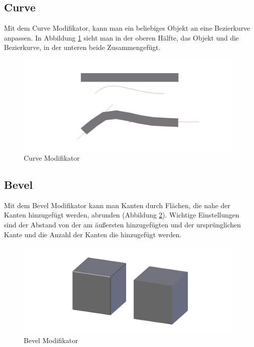 \subsection{Curve}
\citep{blender:curve_modifier} Mit dem Curve Modifikator, kann man ein beliebiges Objekt an eine Bezierkurve anpassen. In Abbildung \ref{modifikatoren:image4} sieht man
in der oberen Hälfte, das Objekt und die Bezierkurve, in der unteren beide Zusammengefügt.
\begin{figure}[h]
    \centering
    \includegraphics[width=.8\textwidth]{images/Modifikatoren-Curve.png}
    \caption{Curve Modifikator}
    \label{modifikatoren:image4}
\end{figure}

\subsection{Bevel}
Mit dem Bevel Modifikator \citep{blender:bevel_modifier} kann man Kanten durch Flächen, die nahe der Kanten hinzugefügt werden, abrunden (Abbildung \ref{modifikatoren:image5}).
Wichtige Einstellungen sind der Abstand von der am äußersten hinzugefügten und der ursprünglichen Kante und die Anzahl der Kanten die hinzugefügt werden.

\begin{figure}[h]
    \centering
    \includegraphics[width=.8\textwidth]{images/Modifikatoren-Bevel.png}
    \caption{Bevel Modifikator}
    \label{modifikatoren:image5}
\end{figure}

